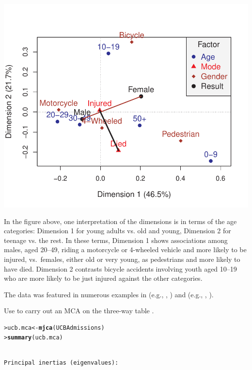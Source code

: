 \documentclass[10pt]{report}\usepackage[]{graphicx}\usepackage[]{color}
\makeatletter
\newcommand{\hlstd}[1]{\textcolor[rgb]{0.345,0.345,0.345}{#1}}%
\newcommand{\hlkwb}[1]{\textcolor[rgb]{0.69,0.353,0.396}{#1}}%
\newcommand{\hlkwd}[1]{\textcolor[rgb]{0.737,0.353,0.396}{\textbf{#1}}}%
\newenvironment{kframe}{%
 \def\at@end@of@kframe{}%
 \ifinner\ifhmode%
  \def\at@end@of@kframe{\end{minipage}}%
  \begin{minipage}{\columnwidth}%
 \fi\fi%
 \def\FrameCommand##1{\hskip\@totalleftmargin \hskip-\fboxsep
 \colorbox{shadecolor}{##1}\hskip-\fboxsep
     \hskip-\linewidth \hskip-\@totalleftmargin \hskip\columnwidth}%
 \MakeFramed {\advance\hsize-\width
   \@totalleftmargin\z@ \linewidth\hsize
   \@setminipage}}%
 {\par\unskip\endMakeFramed%
 \at@end@of@kframe}
\newenvironment{knitrout}{}{} %
\renewenvironment{knitrout}{\small\renewcommand{\baselinestretch}{.85}}{} %
\makeatother
\begin{document}
\begin{Exercises}
\begin{enumerate*}
\begin{ans}
\begin{knitrout}
\centerline{\includegraphics[width=.5\textwidth]{soln/fig/ex6_12b-1} }



\end{knitrout}
    In the figure above, one interpretation of the dimensions is in terms of the age categories:
    Dimension 1 for young adults vs. old and young, Dimension 2 for teenage vs. the rest.
    In these terms, 
    Dimension 1 shows associations among males, aged 20--49, 
    riding a motorcycle or 4-wheeled vehicle and more likely to be injured,
    vs.\ females, either old or very young, as pedestrians and more likely to have died.
    Dimension 2 contrasts bicycle accidents involving youth aged 10--19 
    who are more likely to be just injured against the other categories.
    \end{ans}
    
  \end{enumerate*}

\exercise The  data was featured in numerous examples in 
(e.g., , )
and  (e.g., , ).
  \begin{enumerate*}
    \item Use  to carry out an MCA on the three-way table .
    \begin{ans}
\begin{knitrout}\footnotesize
{}\color{fgcolor}\begin{kframe}
\begin{alltt}
\hlstd{> }\hlstd{ucb.mca} \hlkwb{<-} \hlkwd{mjca}\hlstd{(UCBAdmissions)}
\hlstd{> }\hlkwd{summary}\hlstd{(ucb.mca)}
\end{alltt}
\begin{verbatim}

Principal inertias (eigenvalues):


\end{verbatim}
\end{kframe}
\end{knitrout}
\end{ans}
\end{enumerate*}
\end{Exercises}
\end{document}
